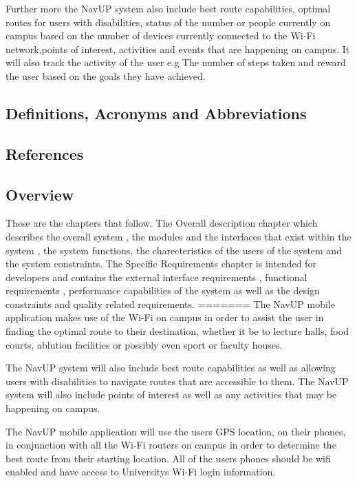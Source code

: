 \documentclass[11pt,a4paper]{article}
\begin{document}
 Further more the  NavUP system also include best route capabilities, optimal routes for users with disabilities, status of the number or people currently on campus based on the number of devices currently connected to the Wi-Fi network,points of interest, activities and events that are happening on campus. It will also track the activity of the user e.g The number of steps taken and reward the user based on the goals  they have achieved.

	\subsection{Definitions, Acronyms and Abbreviations}
	

	\subsection{References}


	\subsection{Overview}
	These are the chapters that follow. The Overall description chapter which describes the overall system , the modules and the interfaces that exist within the system , the system functions, the charecteristics of the users of the system and the system constraints. The Specific Requirements chapter is intended for developers and contains the external interface requirements , functional requirements , performance capabilities of the system as well as the design constraints and quality related requirements.
=======
	The NavUP mobile application makes use of the Wi-Fi on campus in order to assist the user in finding the optimal route to their destination, whether it be to lecture halls, food courts, ablution facilities or possibly even sport or faculty houses.
	\\
\par
	The NavUP system will also include best route capabilities as well as allowing users with disabilities to navigate routes that are accessible to them. The NavUP system will also include points of interest as well as any activities that may be happening on campus.
\\
\par
	The NavUP mobile application will use the users GPS location, on their phones, in conjunction with all the Wi-Fi routers on campus in order to determine the best route from their starting location. All of the users phones should be wifi enabled and have access to Universitys Wi-Fi login information.
	
\end{document}

